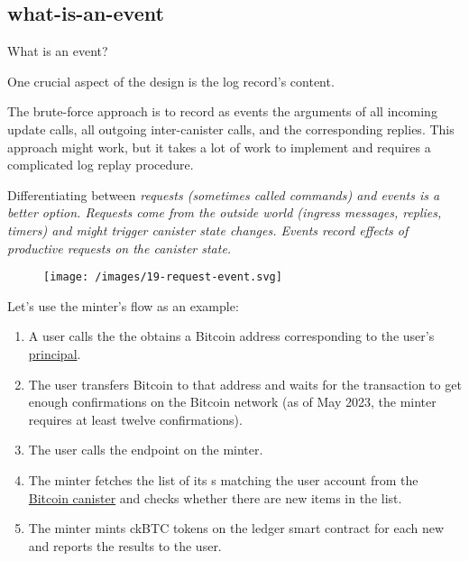 \documentclass{article}
\begin{document}
\subsection{what-is-an-event}{What is an event?}

One crucial aspect of the design is the log record's content.

The brute-force approach is to record as events the arguments of all incoming update calls, all outgoing inter-canister calls, and the corresponding replies.
This approach might work, but it takes a lot of work to implement and requires a complicated log replay procedure.

Differentiating between \em{requests} (sometimes called \em{commands}) and \em{events} is a better option.
\em{Requests} come from the outside world (ingress messages, replies, timers) and \em{might} trigger canister state changes.
\em{Events} record effects of productive requests on the canister state.

\begin{figure}[grayscale-diagram]
  \texttt{[image: /images/19-request-event.svg]}
\end{figure}

Let's use the minter's \href{https://sourcegraph.com/github.com/dfinity/ic@1cbf1f39d31bc426c1e15b073c4ac86d75056bb2/-/blob/rs/bitcoin/ckbtc/minter/ckbtc_minter.did?L253}{} flow as an example:

\begin{enumerate}
  \item
    A user calls the \href{https://sourcegraph.com/github.com/dfinity/ic@1cbf1f39d31bc426c1e15b073c4ac86d75056bb2/-/blob/rs/bitcoin/ckbtc/minter/ckbtc_minter.did?L246}{} the obtains a Bitcoin address corresponding to the user's \href{https://internetcomputer.org/docs/current/references/ic-interface-spec#principal}{principal}.
  \item
    The user transfers Bitcoin to that address and waits for the transaction to get enough confirmations on the Bitcoin network (as of May 2023, the minter requires at least twelve confirmations).
  \item
    The user calls the  endpoint on the minter.
  \item
    The minter fetches the list of its s matching the user account from the \href{https://github.com/dfinity/bitcoin-canister}{Bitcoin canister} and checks whether there are new items in the list.
  \item
    The minter mints ckBTC tokens on the ledger smart contract for each new  and reports the results to the user.
\end{enumerate}
\end{document}
